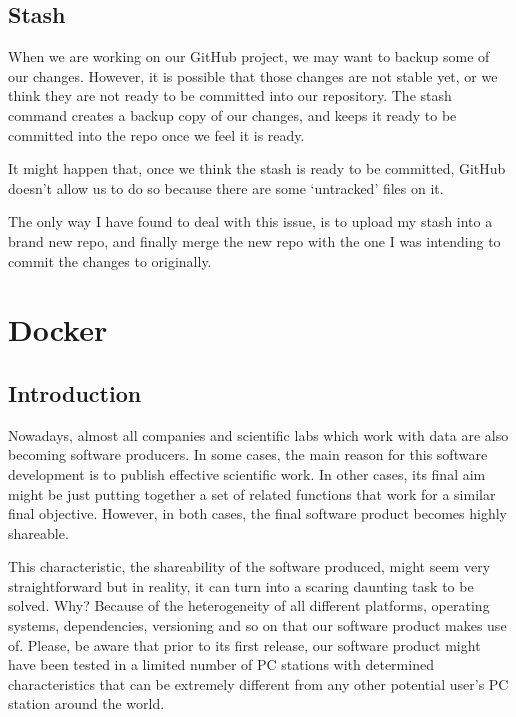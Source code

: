 \documentclass[]{book}
\begin{document}
\section{Stash}\label{stash}

When we are working on our GitHub project, we may want to backup some of
our changes. However, it is possible that those changes are not stable
yet, or we think they are not ready to be committed into our repository.
The stash command creates a backup copy of our changes, and keeps it
ready to be committed into the repo once we feel it is ready.

It might happen that, once we think the stash is ready to be committed,
GitHub doesn't allow us to do so because there are some `untracked'
files on it.

The only way I have found to deal with this issue, is to upload my stash
into a brand new repo, and finally merge the new repo with the one I was
intending to commit the changes to originally.

\chapter{Docker}\label{docker}

\section{Introduction}\label{introduction}

Nowadays, almost all companies and scientific labs which work with data
are also becoming software producers. In some cases, the main reason for
this software development is to publish effective scientific work. In
other cases, its final aim might be just putting together a set of
related functions that work for a similar final objective. However, in
both cases, the final software product becomes highly shareable.

This characteristic, the shareability of the software produced, might
seem very straightforward but in reality, it can turn into a scaring
daunting task to be solved. Why? Because of the heterogeneity of all
different platforms, operating systems, dependencies, versioning and so
on that our software product makes use of. Please, be aware that prior
to its first release, our software product might have been tested in a
limited number of PC stations with determined characteristics that can
be extremely different from any other potential user's PC station around
the world.
\end{document}

